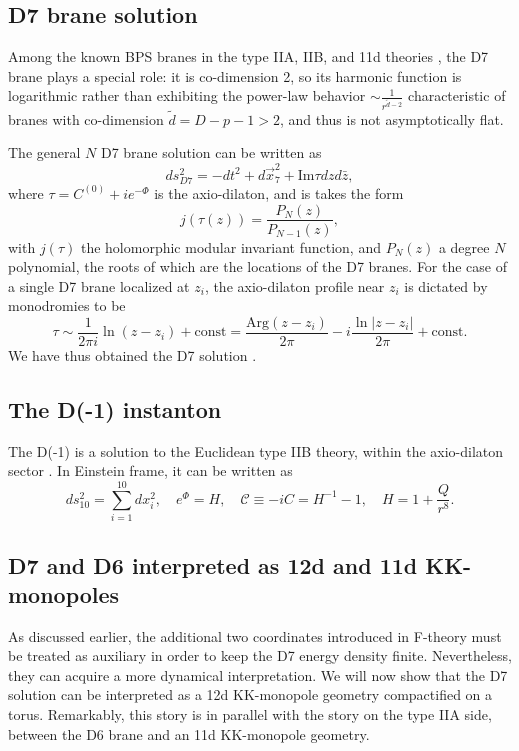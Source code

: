 \subsection{D7 brane solution}
{\color{orange}
Among the known BPS branes in the type IIA, IIB, and 11d theories \cite{Stelle:1998xg}, the D7 brane plays a special role: it is co-dimension 2, so its harmonic function is logarithmic rather than exhibiting the power-law behavior $\sim \frac{1}{r^{\tilde{d}-2}}$ characteristic of branes with co-dimension $\tilde{d} = D-p-1>2$, and thus is not asymptotically flat.

The general $N$ D7 brane solution can be written as \cite{Tseytlin:1996ne}
\begin{equation}
ds_{D7}^2 = -dt^2 + d\vec{x}_7^2 + \text{Im} \tau dz d\bar z,
\end{equation}
where $\tau = C^{(0)} + i e^{-\Phi}$ is the axio-dilaton, and is takes the form
\begin{equation}
j(\tau(z)) = \frac{P_N(z)}{P_{N-1}(z)},
\end{equation}
with $j(\tau)$ the holomorphic modular invariant function, and $P_N(z)$ a degree $N$ polynomial, the roots of which are the locations of the D7 branes.
For the case of a single D7 brane localized at $z_i$, the axio-dilaton profile near $z_i$ is dictated by monodromies to be
\begin{equation}
\tau \sim \frac{1}{2\pi i}\ln (z-z_i)+\text{const}
 = \frac{\text{Arg}(z-z_i)}{2\pi} -i\frac{\ln |z-z_i|}{2\pi}+\text{const}.
 \label{D7 axio-dilaton profile}
\end{equation}
We have thus obtained the D7 solution \cite{Gibbons:1995vg,Bergshoeff:2006jj,Greene:1989ya}.

}

\subsection{The D(-1) instanton}

{\color{orange}
The D(-1) is a solution to the Euclidean type IIB theory, within the axio-dilaton sector \cite{Gibbons:1995vg}.
In Einstein frame, it can be written as
\begin{equation}
ds_{10}^2 = \sum_{i=1}^{10} dx_i^2,\quad
e^\Phi = H, \quad\mathcal C\equiv-iC = H^{-1}-1,\quad
H=1+\frac{Q}{r^8}.
\end{equation}
}

\subsection{D7 and D6 interpreted as 12d and 11d KK-monopoles}
As discussed earlier, the additional two coordinates introduced in F-theory \cite{Vafa:1996xn} must be treated as auxiliary in order to keep the D7 energy density finite.
Nevertheless, they can acquire a more dynamical interpretation.
We will now show that the D7 solution can be interpreted as a 12d KK-monopole geometry compactified on a torus.
Remarkably, this story is in parallel with the story on the type IIA side, between the D6 brane and an 11d KK-monopole geometry.

